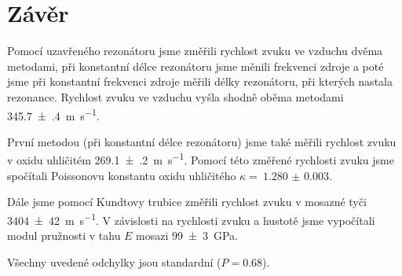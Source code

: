 \section*{Závěr}
Pomocí uzavřeného rezonátoru jsme změřili rychlost zvuku ve vzduchu dvěma metodami, při konstantní délce rezonátoru jsme měnili frekvenci zdroje a poté jsme při konstantní frekvenci zdroje měřili délky rezonátoru, při kterých nastala rezonance.
Rychlost zvuku ve vzduchu vyšla shodně oběma metodami \SI{345.7(4)}{\m\per\s}.

První metodou (při konstantní délce rezonátoru) jsme také měřili rychlost zvuku v oxidu uhličitém \linebreak \SI{269.1(2)}{\m\per\s}.
Pomocí této změřené rychlosti zvuku jsme spočítali Poissonovu konstantu oxidu uhličitého $\kappa =~\num{1.280(3)}$.

Dále jsme pomocí Kundtovy trubice změřili rychlost zvuku v mosazné tyči \SI{3404(42)}{\m\per\s}.
V závislosti na rychlosti zvuku a hustotě jsme vypočítali modul pružnosti v tahu $E$ mosazi \SI{99(3)}{\GPa}.


Všechny uvedené odchylky jsou standardní ($P=\num{0.68}$).